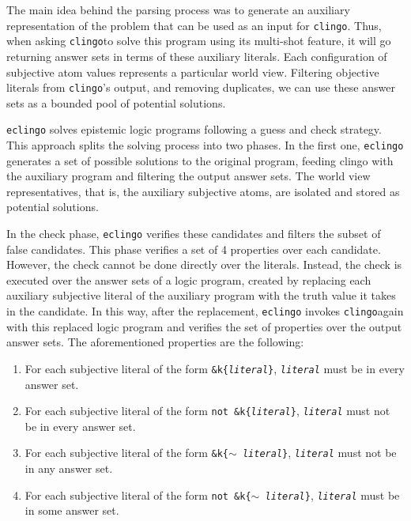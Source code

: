 \documentclass{new_tlp}
\def\eclingo{{\tt eclingo}}
\def\clingo{{\tt clingo}}
\begin{document}
The main idea behind the parsing process was to generate an auxiliary representation of the problem that can be used as an input for \clingo. Thus, when asking \clingo to solve this program using its multi-shot feature, it will go returning answer sets in terms of these auxiliary literals. Each configuration of subjective atom values represents a particular world view. Filtering objective literals from \clingo's output, and removing duplicates, we can use these answer sets as a bounded pool of potential solutions.

\texttt{eclingo} solves epistemic logic programs following a guess and check strategy. This approach splits the solving process into two phases. In the first one, \eclingo{} generates a set of possible solutions to the original program, feeding clingo with the auxiliary program and filtering the output answer sets. The world view representatives, that is, the auxiliary subjective atoms, are isolated and stored as potential solutions.

In the check phase, \eclingo{} verifies these candidates and filters the subset of false candidates.
This phase verifies a set of 4 properties over each candidate. However, the check cannot be done directly over the literals. Instead, the check is executed over the answer sets of a logic program, created by replacing each auxiliary subjective literal of the auxiliary program with the truth value it takes in the candidate. In this way, after the replacement, \eclingo{} invokes \clingo again with this replaced logic program and verifies the set of properties over the output answer sets. The aforementioned properties are the following:
\begin{enumerate}
    \item For each subjective literal of the form \texttt{\&k\{\emph{literal}\}}, \texttt{\emph{literal}} must be in every answer set.

    \item For each subjective literal of the form \texttt{not \&k\{\emph{literal}\}}, \texttt{\emph{literal}} must not be in every answer set.

    \item For each subjective literal of the form \texttt{\&k\{$\sim$ \emph{literal}\}}, \texttt{\emph{literal}} must not be in any answer set.

    \item For each subjective literal of the form \texttt{not \&k\{$\sim$ \emph{literal}\}}, \texttt{\emph{literal}} must be in some answer set.
\end{enumerate}
\end{document}
